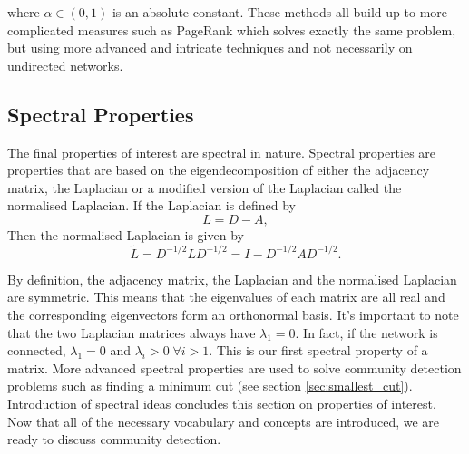 where $\alpha \in (0, 1)$ is an absolute constant. These methods all build up to more complicated measures such as PageRank\cite{pagerank} which solves exactly the same problem, but using more advanced and intricate techniques and not necessarily on undirected networks.

\subsection{Spectral Properties}
The final properties of interest are spectral in nature. Spectral properties are properties that are based on the eigendecomposition of either the adjacency matrix, the Laplacian or a modified version of the Laplacian called the normalised Laplacian. If the Laplacian is defined by
$$ L = D - A, $$
Then the normalised Laplacian is given by 
$$ \tilde L = D^{-1/2}LD^{-1/2} = I - D^{-1/2}AD^{-1/2}. $$

By definition, the adjacency matrix, the Laplacian and the normalised Laplacian are symmetric. This means that the eigenvalues of each matrix are all real and the corresponding eigenvectors form an orthonormal basis. It's important to note that the two Laplacian matrices always have $\lambda_1 = 0$. In fact, if the network is connected, $\lambda_1 = 0$ and $\lambda_i > 0 \; \forall i > 1$. This is our first spectral property of a matrix. More advanced spectral properties are used to solve community detection problems such as finding a minimum cut (see section \ref{sec:smallest_cut}). Introduction of spectral ideas concludes this section on properties of interest. Now that all of the necessary vocabulary and concepts are introduced, we are ready to discuss community detection.
